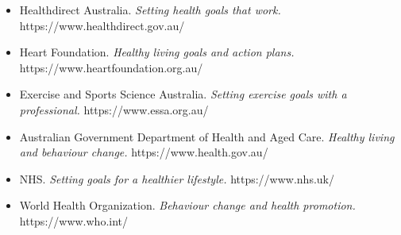 \begin{itemize}
    \item Healthdirect Australia. \textit{Setting health goals that work.} https://www.healthdirect.gov.au/
    \item Heart Foundation. \textit{Healthy living goals and action plans.} https://www.heartfoundation.org.au/
    \item Exercise and Sports Science Australia. \textit{Setting exercise goals with a professional.} https://www.essa.org.au/
    \item Australian Government Department of Health and Aged Care. \textit{Healthy living and behaviour change.} https://www.health.gov.au/
    \item NHS. \textit{Setting goals for a healthier lifestyle.} https://www.nhs.uk/
    \item World Health Organization. \textit{Behaviour change and health promotion.} https://www.who.int/
\end{itemize}
